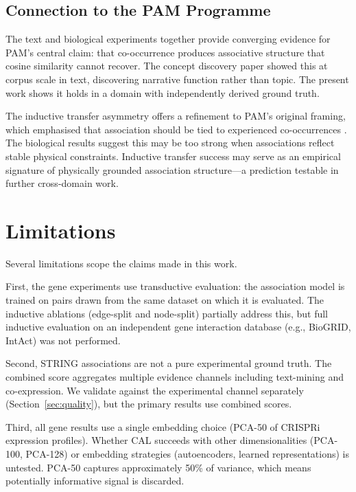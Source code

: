 \documentclass[11pt]{article}
\begin{document}
\subsection{Connection to the PAM Programme}

The text and biological experiments together provide converging evidence for PAM's central claim: that co-occurrence produces associative structure that cosine similarity cannot recover. The concept discovery paper \citep{dury2026concepts} showed this at corpus scale in text, discovering narrative function rather than topic. The present work shows it holds in a domain with independently derived ground truth.

The inductive transfer asymmetry offers a refinement to PAM's original framing, which emphasised that association should be tied to experienced co-occurrences \citep{dury2026pam}. The biological results suggest this may be too strong when associations reflect stable physical constraints. Inductive transfer success may serve as an empirical signature of physically grounded association structure---a prediction testable in further cross-domain work.

\section{Limitations}
\label{sec:limitations}

Several limitations scope the claims made in this work.

First, the gene experiments use transductive evaluation: the association model is trained on pairs drawn from the same dataset on which it is evaluated. The inductive ablations (edge-split and node-split) partially address this, but full inductive evaluation on an independent gene interaction database (e.g., BioGRID, IntAct) was not performed.

Second, STRING associations are not a pure experimental ground truth. The combined score aggregates multiple evidence channels including text-mining and co-expression. We validate against the experimental channel separately (Section~\ref{sec:quality}), but the primary results use combined scores.

Third, all gene results use a single embedding choice (PCA-50 of CRISPRi expression profiles). Whether CAL succeeds with other dimensionalities (PCA-100, PCA-128) or embedding strategies (autoencoders, learned representations) is untested. PCA-50 captures approximately 50\% of variance, which means potentially informative signal is discarded.
\end{document}
